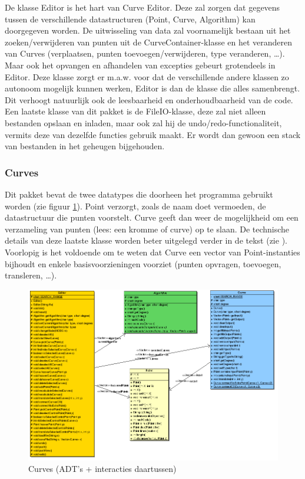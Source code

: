\documentclass[a4paper,11pt,oneside, titlepage]{article}
\begin{document}
De klasse Editor is het hart van Curve Editor. Deze zal zorgen dat gegevens tussen de verschillende datastructuren (Point, Curve, Algorithm) kan doorgegeven worden.
De uitwisseling van data zal voornamelijk bestaan uit het zoeken/verwijderen van punten uit de CurveContainer-klasse en het veranderen van Curves (verplaatsen, punten toevoegen/verwijderen, type veranderen, \ldots).
Maar ook het opvangen en afhandelen van excepties gebeurt grotendeels in Editor. Deze klasse zorgt er m.a.w. voor dat de 
verschillende andere klassen zo autonoom mogelijk kunnen werken, Editor is dan de klasse die alles samenbrengt. Dit verhoogt natuurlijk ook de leesbaarheid en onderhoudbaarheid van de code.\newline \newline
Een laatste klasse van dit pakket is de FileIO-klasse, deze zal niet alleen bestanden opslaan en
inladen, maar ook zal hij de undo/redo-functionaliteit, vermits deze van
dezelfde functies gebruik maakt. Er wordt dan gewoon een stack van bestanden in het geheugen bijgehouden.
\subsubsection{Curves}
Dit pakket bevat de twee datatypes die doorheen het programma gebruikt worden (zie figuur \ref{iCurv}). Point verzorgt, zoals
de naam doet vermoeden, de datastructuur die punten voorstelt. Curve geeft dan weer de
mogelijkheid om een verzameling van punten (lees: een kromme of curve) op te slaan. De
technische details van deze laatste klasse worden beter uitgelegd verder in de tekst (zie ). 
Voorlopig is het voldoende om te weten dat Curve een vector van Point-instanties bijhoudt en enkele
basisvoorzieningen voorziet (punten opvragen, toevoegen, transleren, \ldots).
\begin{figure}[htbp]
\centering
\includegraphics[scale=0.5]{./UML2/Gen.png}
\caption{Curves (ADT's + interacties daartussen)}\label{iCurv}
\end{figure}
\end{document}
